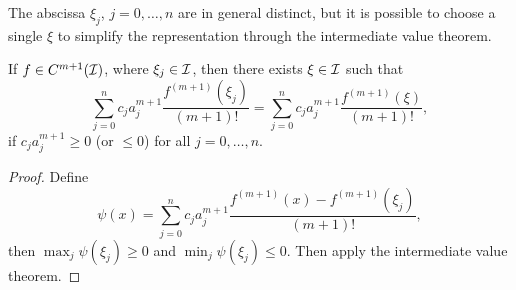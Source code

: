 \begin{remark}
    The abscissa $\xi_j$, $j=0,\dots,n$ are in general distinct, but it is possible to choose a single $\xi$ to simplify the representation through the intermediate value theorem. 
\end{remark}
\begin{lemma}\label{Lem: FD COEF}
    If $f\in C^{m+1}(\mathcal I)$, where $\xi_j\in\mathcal I$, then there exists $\xi\in \mathcal I$ such that 
    \begin{equation}
        \sum_{j=0}^n c_j  a_j^{m+1}\frac{f^{(m+1)}(\xi_j)}{(m+1)!} =   \sum_{j=0}^n c_j  a_j^{m+1}\frac{f^{(m+1)}(\xi)}{(m+1)!},
    \end{equation}
    if $c_j a_j^{m+1}\ge 0$ (or $\le 0$) for all $j=0,\dots, n$. 
\end{lemma}
\begin{proof}
    Define $$\psi(x) =  \sum_{j=0}^n c_j  a_j^{m+1}\frac{f^{(m+1)}(x) - f^{(m+1)}(\xi_j)}{(m+1)!}, $$
    then $\max_j \psi(\xi_j)\ge 0$ and $\min_j \psi(\xi_j) \le 0$. Then apply the intermediate value theorem. 
\end{proof}

